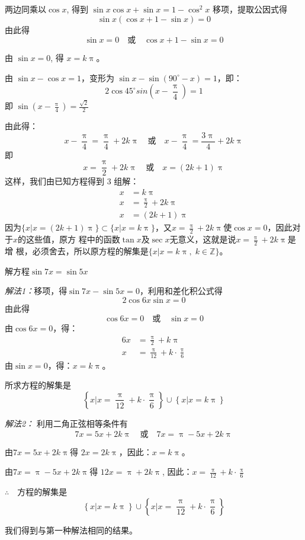 \begin{solution}
两边同乘以$\cos x$, 得到
$\sin x\cos x+\sin x=1-\cos^2x$
移项，提取公因式得
\[\sin x(\cos x +1-\sin x)=0\]
由此得
\[\sin x=0\quad  \text{或}\quad \cos x+1-\sin x=0\]

由 $\sin x=0$, 得 $x=k\uppi$。 

由 $\sin x-\cos x=1$，变形为 $\sin x-\sin(90^{\circ}-x)=1$，即：
\[2\cos45^{\circ} sin\left(x-\frac{\uppi}{4}\right)=1\]
即 $\sin\left(x-\frac{\uppi}{4}\right)=\frac{\sqrt{2}}{2}$

由此得：
\[x-\frac{\uppi}{4}=\frac{\uppi}{4}+2k\uppi\quad  \text{或}\quad x-\frac{\uppi}{4}=\frac{3\uppi}{4}+2k\uppi\]
即
\[x=\frac{\uppi}{2}+2k\uppi\quad  \text{或}\quad x=(2k+1)\uppi\]
这样，我们由已知方程得到 3 组解：
\begin{align}
    x&=k\uppi\\
    x&=\frac{\uppi}{2}+2k\uppi\\
    x&=(2k+1)\uppi
\end{align}
因为$\{x|x=(2k+1)\uppi\}\subset \{x|x=k\uppi\}$，又$x=\frac{\uppi}{2}+2k\uppi$使$\cos x=0$，因此对于$x$的这些值，原方
程中的函数$\tan x$及$\sec x$无意义，这就是说$x=\frac{\uppi}{2}+2k\uppi$是增
根，必须舍去，所以原方程的解集是$\{x|x=k\uppi,\; k\in\mathbb{Z}\}$。
\end{solution}

\begin{example}
    解方程$\sin7x=\sin5x$
\end{example}

\begin{solution}    
\emph{解法1：}移项，得$\sin7x-\sin5x=0$，利用和差化积公式得
\[2\cos6x\sin x=0\]
由此得
\[\cos6x=0\quad  \text{或}\quad \sin x=0\]
由$\cos6x=0$，得：
\[\begin{split}
    6x&=\frac{\uppi}{2}+k\uppi\\
    x&=\frac{\uppi}{12}+k\cdot \frac{\uppi}{6}
\end{split} \]
由$\sin x=0$，得：$x=k\uppi$。
    
所求方程的解集是
\[\left\{x\big|x=\frac{\uppi}{12}+k\cdot \frac{\uppi}{6}\right\}\cup\left\{x\big|x=k\uppi\right\} \]
    
\emph{解法2：} 利用二角正弦相等条件有
\[7x=5x+2k\uppi \quad \text{或}\quad 7x=\uppi -5x+2k\uppi \]

由$7x=5x+2k\uppi$得 $2x=2k\uppi$，因此：$x=k\uppi$。

由$7x=\uppi -5x+2k\uppi$得
$12x=\uppi +2k\uppi$, 因此：$x=\frac{\uppi}{12}+k\cdot \frac{\uppi}{6}$

$\therefore\quad $方程的解集是
\[\left\{x\big|x=k\uppi\right\}\cup\left\{x\big|x=\frac{\uppi}{12}+k\cdot \frac{\uppi}{6}\right\} \]

我们得到与第一种解法相同的结果。
\end{solution}

